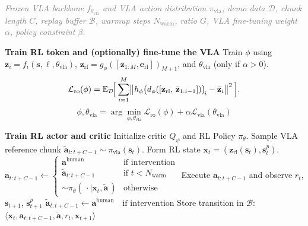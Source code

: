\begin{algorithm}[t]
\caption{\MethodName{}}
\label{alg:main}
\begin{algorithmic}[1]
\REQUIRE \textcolor{gray}{\textit{Frozen VLA backbone $f_{\theta_\text{vla}}$ and VLA action distribution $\pi_{\text{vla}}$;
demo data $\mathcal{D}$, chunk length $C$, replay buffer $\mathcal{B}$,
warmup steps $N_{\text{warm}}$, ratio $G$, VLA fine-tuning weight $\alpha$, policy constraint $\beta$.}} 
\vspace{2pt}

\STATE \textbf{Train RL token and (optionally) fine-tune the VLA}
\STATE Train $\phi$ using $\mathbf{z}_i=f_i(\mathbf{s}, \ell, \theta_\text{vla})$, $\mathbf{z}_{\text{rl}} = g_\phi([\mathbf{z}_{1:M}, \mathbf{e}_\text{rl}])_{M+1}$, and $\theta_\text{vla}$ (only if $\alpha > 0$).
\[
\mathcal{L}_{\text{ro}}(\phi) = \mathbb{E}_{\mathcal{D}}\!\Bigl[\,
    \sum_{i=1}^{M}
      \bigl\lVert h_\phi\bigl(d_\phi([\mathbf{z}_{\text{rl}},\,\bar{\mathbf{z}}_{1:i-1}])\bigr)_{\!i}
        - \bar{\mathbf{z}}_i \bigr\rVert^2
  \,\Bigr].
\]
\STATE 
\[
\phi, \theta_{\text{vla}} = \arg \min_{\phi, \theta_{\text{vla}}} \mathcal{L}_{\text{ro}}(\phi) + \alpha \mathcal{L}_{\text{vla}}(\theta_\text{vla})
\]
\vspace{2pt}

\STATE \textbf{Train RL actor and critic}
\STATE Initialize critic $Q_\psi$ and RL Policy $\pi_\theta$.
  \STATE Sample VLA reference chunk $\tilde{\mathbf{a}}_{t:t+C-1}\sim \pi_{\text{vla}}(\mathbf{s}_t)$.
  \STATE Form RL state $\mathbf{x}_t = (\mathbf{z}_{\text{rl}}(\mathbf{s}_t), \mathbf{s}^p_t)$.
  \STATE $
\mathbf{a}_{t:t+C-1} \leftarrow
\begin{cases}
\mathbf{a}^{\text{human}} & \text{if intervention} \\
\tilde{\mathbf{a}}_{t:t+C-1}        & \text{if } t < N_{\text{warm}} \\
\sim \pi_\theta(\,\cdot \mid \mathbf{x}_t,\tilde{\mathbf{a}}\,) & \text{otherwise}
\end{cases}
$
  \STATE Execute $\mathbf{a}_{t:t+C-1}$ and observe $r_t$, $\mathbf{s}_{t+1}$, $\mathbf{s}^p_{t+1}$
\STATE $
\tilde{\mathbf{a}}_{t:t+C-1} \leftarrow \mathbf{a}^{\text{human}} \quad \text{if intervention} $
  \STATE Store transition in $\mathcal{B}$:\quad $\langle\mathbf{x}_t,\mathbf{a}_{t:t+C-1},\tilde{\mathbf{a}},r_t,\mathbf{x}_{t+1}\rangle$


\end{algorithmic}
\end{algorithm}
